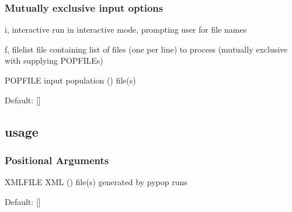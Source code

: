 \documentclass[letterpaper,10pt,english,openany,oneside]{sphinxmanual}
\begin{document}
\subsubsection{Mutually exclusive input options}
\label{\detokenize{docs/guide-chapter-usage:mutually-exclusive-input-options}}\begin{optionlist}{3cm}
\item [\sphinxhyphen{}i, \sphinxhyphen{}\sphinxhyphen{}interactive]  
\sphinxAtStartPar
run in interactive mode, prompting user for file names
\item [\sphinxhyphen{}f, \sphinxhyphen{}\sphinxhyphen{}filelist]  
\sphinxAtStartPar
file containing list of files (one per line) to process
(mutually exclusive with supplying POPFILEs)
\item [POPFILE]  
\sphinxAtStartPar
input population () file(s)

\sphinxAtStartPar
Default: {[}{]}
\end{optionlist}


\subsection{ usage}
\label{\detokenize{docs/guide-chapter-usage:popmeta-usage}}\label{\detokenize{docs/guide-chapter-usage:guide-popmeta-cli}}
\begin{sphinxVerbatim}[commandchars=\\\{\}]
  \PYG{p}{[}\PYG{p}{]} \PYG{p}{[} \PYG{p}{]} \PYG{p}{[}\PYG{p}{]} \PYG{p}{[}\PYG{p}{]} \PYG{p}{[}\PYG{p}{]} \PYG{p}{[} \PYG{p}{]} \PYG{p}{[}\PYG{p}{]} \PYG{p}{[}   \PYG{p}{]}
                \PYG{p}{[} \PYG{p}{]}
\end{sphinxVerbatim}


\subsubsection{Positional Arguments}
\label{\detokenize{docs/guide-chapter-usage:positional-arguments}}\begin{optionlist}{3cm}
\item [XMLFILE]  
\sphinxAtStartPar
XML () file(s) generated by pypop runs

\sphinxAtStartPar
Default: {[}{]}
\end{optionlist}
\end{document}
